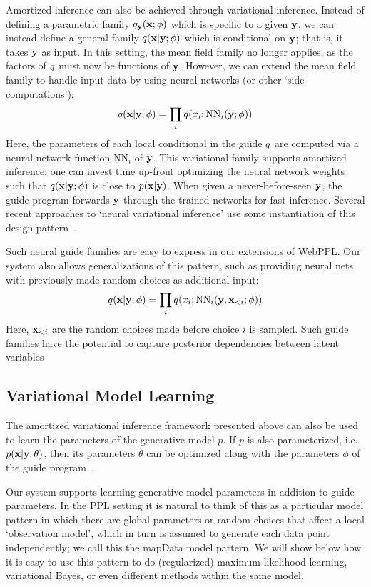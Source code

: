 Amortized inference can also be achieved through variational inference.
Instead of defining a parametric family $q_{\mathbf{y}}(\mathbf{x} ; \phi)$ which is specific to a given $\mathbf{y}$, we can instead define a general family $q(\mathbf{x} | \mathbf{y} ; \phi)$ which is conditional on $\mathbf{y}$; that is, it takes $\mathbf{y}$ as input.
In this setting, the mean field family no longer applies, as the factors of $q$ must now be functions of $\mathbf{y}$.
However, we can extend the mean field family to handle input data by using neural networks (or other `side computations'):
\begin{equation*}
q(\mathbf{x} | \mathbf{y} ; \phi) = \prod_i q(x_i ; \text{NN}_i(\mathbf{y} ; \phi))
\end{equation*}
Here, the parameters of each local conditional in the guide $q$ are computed via a neural network function $\text{NN}_i$ of $\mathbf{y}$.
This variational family supports amortized inference: one can invest time up-front optimizing the neural network weights such that $q(\mathbf{x} | \mathbf{y} ; \phi)$ is close to $p(\mathbf{x} | \mathbf{y})$. When given a never-before-seen $\mathbf{y}$, the guide program forwards $\mathbf{y}$ through the trained networks for fast inference.
Several recent approaches to `neural variational inference' use some instantiation of this design pattern~\cite{NVIL,DLGM,AEVB}.

Such neural guide families are easy to express in our extensions of WebPPL. Our system also allows generalizations of this pattern, such as providing neural nets with previously-made random choices as additional input:
\begin{equation*}
q(\mathbf{x} | \mathbf{y} ; \phi) = \prod_i q(x_i ; \text{NN}_i(\mathbf{y}, \mathbf{x}_{<i} ; \phi))
\end{equation*}
Here, $\mathbf{x}_{<i}$ are the random choices made before choice $i$ is sampled. Such guide families have the potential to capture posterior dependencies between latent variables

\subsection{Variational Model Learning}

The amortized variational inference framework presented above can also be used to learn the parameters of the generative model $p$. If $p$ is also parameterized, i.e. $p(\mathbf{x} | \mathbf{y} ; \theta)$, then its parameters $\theta$ can be optimized along with the parameters $\phi$ of the guide program~\cite{NVIL,DLGM,AEVB}.

Our system supports learning generative model parameters in addition to guide parameters.
In the PPL setting it is natural to think of this as a particular model pattern in which there are global parameters or random choices that affect a local `observation model', which in turn is assumed to generate each data point independently; we call this the mapData model pattern.
We will show below how it is easy to use this pattern to do (regularized) maximum-likelihood learning, variational Bayes, or even different methods within the same model.

